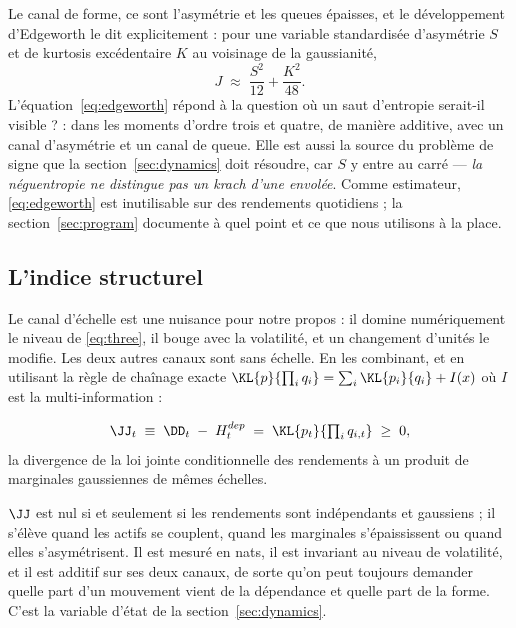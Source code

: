 Le canal de forme, ce sont l'asymétrie et les queues épaisses, et le
développement d'Edgeworth le dit explicitement : pour une variable standardisée
d'asymétrie $S$ et de kurtosis excédentaire $K$ au voisinage de la gaussianité,
\begin{equation}
\label{eq:edgeworth}
J \;\approx\; \frac{S^2}{12} + \frac{K^2}{48}.
\end{equation}
L'équation~\eqref{eq:edgeworth} répond à la question \og où un saut d'entropie
serait-il visible ? \fg{} : dans les moments d'ordre trois et quatre, de manière
additive, avec un canal d'asymétrie et un canal de queue. Elle est aussi la
source du problème de signe que la section~\ref{sec:dynamics} doit résoudre, car
$S$ y entre au carré --- \emph{la néguentropie ne distingue pas un krach d'une
envolée}. Comme estimateur, \eqref{eq:edgeworth} est inutilisable sur des
rendements quotidiens ; la section~\ref{sec:program} documente à quel point et
ce que nous utilisons à la place.

\subsection{L'indice structurel}

Le canal d'échelle est une nuisance pour notre propos : il domine numériquement
le niveau de \eqref{eq:three}, il bouge avec la volatilité, et un changement
d'unités le modifie. Les deux autres canaux sont sans échelle. En les combinant,
et en utilisant la règle de chaînage exacte
$\KL{p}{\prod_i q_i} = \sum_i \KL{p_i}{q_i} + I(x)$ où $I$ est la
multi-information :

\begin{definition}
\label{def:J}
\begin{equation}
\JJ_t \;\equiv\; \DD_t \;-\; H^{dep}_t \;=\; \KL{p_t}{\textstyle\prod_i q_{i,t}} \;\ge\; 0 ,
\end{equation}
la divergence de la loi jointe conditionnelle des rendements à un produit de
marginales gaussiennes de mêmes échelles.
\end{definition}

$\JJ$ est nul si et seulement si les rendements sont indépendants et gaussiens ;
il s'élève quand les actifs se couplent, quand les marginales s'épaississent ou
quand elles s'asymétrisent. Il est mesuré en nats, il est invariant au niveau de
volatilité, et il est additif sur ses deux canaux, de sorte qu'on peut toujours
demander quelle part d'un mouvement vient de la dépendance et quelle part de la
forme. C'est la variable d'état de la section~\ref{sec:dynamics}.

